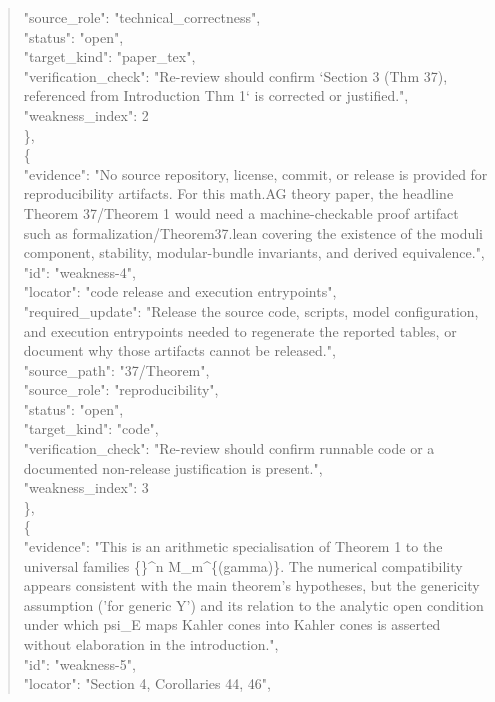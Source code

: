 \documentclass[11pt]{article}
\begin{document}
\begin{quote}
      "source\_role": "technical\_correctness",\\
      "status": "open",\\
      "target\_kind": "paper\_tex",\\
      "verification\_check": "Re-review should confirm `Section 3 (Thm 37), referenced from Introduction Thm 1` is corrected or justified.",\\
      "weakness\_index": 2\\
    \},\\
    \{\\
      "evidence": "No source repository, license, commit, or release is provided for reproducibility artifacts. For this math.AG theory paper, the headline Theorem 37/Theorem 1 would need a machine-checkable proof artifact such as formalization/Theorem37.lean covering the existence of the moduli component, stability, modular-bundle invariants, and derived equivalence.",\\
      "id": "weakness-4",\\
      "locator": "code release and execution entrypoints",\\
      "required\_update": "Release the source code, scripts, model configuration, and execution entrypoints needed to regenerate the reported tables, or document why those artifacts cannot be released.",\\
      "source\_path": "37/Theorem",\\
      "source\_role": "reproducibility",\\
      "status": "open",\\
      "target\_kind": "code",\\
      "verification\_check": "Re-review should confirm runnable code or a documented non-release justification is present.",\\
      "weakness\_index": 3\\
    \},\\
    \{\\
      "evidence": "This is an arithmetic specialisation of Theorem 1 to the universal families \{\}\^{}n M\_m\^{}\{(gamma)\}. The numerical compatibility appears consistent with the main theorem's hypotheses, but the genericity assumption ('for generic Y') and its relation to the analytic open condition under which psi\_E maps Kahler cones into Kahler cones is asserted without elaboration in the introduction.",\\
      "id": "weakness-5",\\
      "locator": "Section 4, Corollaries 44, 46",\\

\end{quote}
\end{document}
